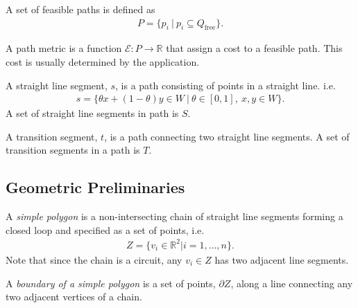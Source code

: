 \documentclass[../main.tex]{subfiles}
\begin{document}
\begin{definition}
A set of feasible paths is defined as
	\begin{equation}
	\begin{aligned}
		P=\{p_i\ |\ p_i\subseteq Q_{\text{free}}\}.
	\end{aligned}
	\end{equation}
\end{definition}

\begin{definition}
A path metric is a function $\mathcal{E}:P\to\mathbb{R}$ that assign a cost to a feasible path. This cost is usually determined by the application.
\end{definition}

\begin{definition}
A straight line segment, $s$, is a path consisting of points in a straight line. i.e.
	\begin{equation}
	\begin{aligned}
		s=\{\theta x+(1-\theta)y\in W\ |\ \theta\in[0,1],\ x,y\in W\}.
	\end{aligned}
	\end{equation}
A set of straight line segments in path is $S$.
\end{definition}

\begin{definition}
A transition segment, $t$, is a path connecting two straight line segments. A set of transition segments in a path is $T$.
\end{definition}

\subsection{Geometric Preliminaries}
\begin{definition}
A \emph{simple polygon} is a non-intersecting chain of straight line segments forming a closed loop and specified as a set of points, i.e.
	\begin{equation}
	\begin{aligned}
		Z=\{v_i\in\mathbb{R}^2|i=1,\ldots,n\}.
	\end{aligned}
	\end{equation}
Note that since the chain is a circuit, any $v_i\in Z$ has two adjacent line segments. 
\end{definition}

\begin{definition}
A \emph{boundary of a simple polygon} is a set of points, $\partial Z$, along a line connecting any two adjacent vertices of a chain. 
\end{definition}
\end{document}

